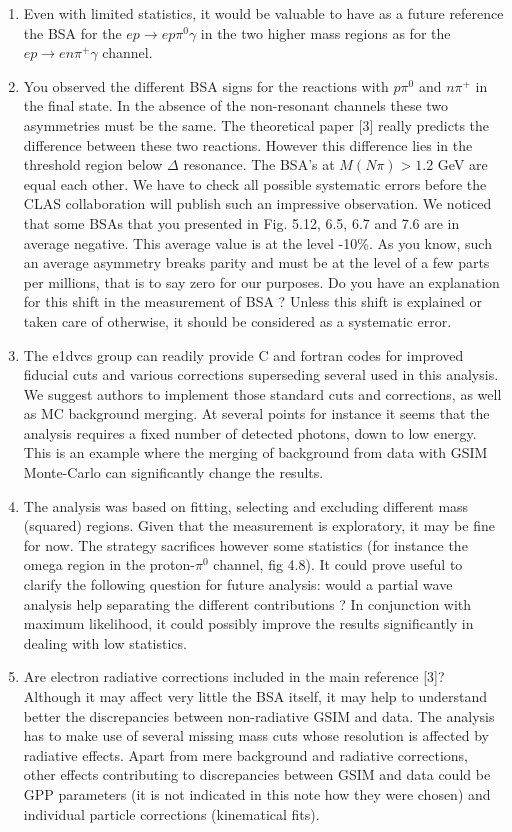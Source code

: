 \documentclass[11pt]{paper}
\begin{document}
\begin{enumerate}
\item Even with limited statistics, it would be valuable to have as a future reference the BSA for the $ep\to ep\pi^0\gamma$ in the two higher mass regions as for the $ep\to en\pi^+\gamma$ channel.

\item You observed the different BSA signs for the reactions with $p\pi^0$ and $n\pi^+$ in the final state.  
In the absence of the non-resonant channels these two asymmetries must be the same. 
The theoretical paper [3] really predicts the difference between these two reactions. 
However this difference lies in the threshold region below $\Delta$ resonance. The BSA's  at $M(N\pi)>1.2$ GeV are equal each other.
We have to check all possible systematic errors before the CLAS collaboration will publish such an impressive observation.  
We noticed that some BSAs that you presented in Fig. 5.12, 6.5, 6.7 and 7.6 are in average negative. 
This average value is at the level -10\%. 
As you know, such an average asymmetry breaks parity and must be at the level of a few parts per millions, that is to say zero for our purposes. 
Do you have an explanation for this shift in the measurement of BSA ?
Unless this shift is explained or taken care of otherwise, it should be considered as a systematic error.

\item The e1dvcs group can readily provide C and fortran codes for improved fiducial cuts and various corrections superseding several used in this analysis.
We suggest authors to implement those standard cuts and corrections, as well as MC background merging.
At several points for instance it seems that the analysis requires a fixed number of detected photons, down to low energy.
This is an example where the merging of background from data with GSIM Monte-Carlo can significantly change the results.

\item The analysis was based on fitting, selecting and excluding different mass (squared) regions.
Given that the measurement is exploratory, it may be fine for now.
The strategy sacrifices however some statistics (for instance the omega region in the 
proton-$\pi^0$ channel, fig 4.8).
It could prove useful to clarify the following question for future analysis: would a partial wave analysis help separating the different contributions ?
In conjunction with maximum likelihood, it could possibly improve the results significantly in dealing with low statistics.

\item Are electron radiative corrections included in the main reference [3]?
Although it may affect very little the BSA itself, it may help to understand better the discrepancies between non-radiative GSIM and data.
The analysis has to make use of several missing mass cuts whose resolution is affected by radiative effects.
Apart from mere background and radiative corrections, other effects contributing to discrepancies between GSIM and data could be GPP parameters 
(it is not indicated in this note how they were chosen) and individual particle corrections (kinematical fits).


\end{enumerate}
\end{document}
